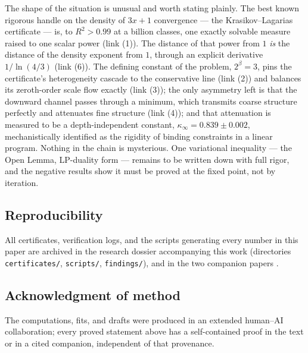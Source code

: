 \documentclass[11pt]{article}
\theoremstyle{definition}
\theoremstyle{remark}
\newcommand{\bet}{\beta}
\newcommand{\kap}{\kappa}
\begin{document}
The shape of the situation is unusual and worth stating plainly. The best known
rigorous handle on the density of $3x+1$ convergence --- the Krasikov--Lagarias
certificate --- is, to $R^2 > 0.99$ at a billion classes, one exactly solvable
measure raised to one scalar power (link (1)). The distance of that power from
$1$ \emph{is} the distance of the density exponent from $1$, through an explicit
derivative $1/\ln(4/3)$ (link (6)). The defining constant of the problem,
$2^{\bet} = 3$, pins the certificate's heterogeneity cascade to the conservative
line (link (2)) and balances its zeroth-order scale flow exactly (link (3)); the
only asymmetry left is that the downward channel passes through a minimum, which
transmits coarse structure perfectly and attenuates fine structure (link (4));
and that attenuation is measured to be a depth-independent constant,
$\kap_\infty = 0.839 \pm 0.002$, mechanistically identified as the rigidity of
binding constraints in a linear program. Nothing in the chain is mysterious.
One variational inequality --- the Open Lemma, LP-duality form --- remains to be
written down with full rigor, and the negative results show it must be proved at
the fixed point, not by iteration.

\subsection*{Reproducibility}
All certificates, verification logs, and the scripts generating every number in
this paper are archived in the research dossier accompanying this work
(directories \texttt{certificates/}, \texttt{scripts/}, \texttt{findings/}), and
in the two companion papers \cite{Temp26,Drift26}.

\subsection*{Acknowledgment of method}
The computations, fits, and drafts were produced in an extended human--AI
collaboration; every proved statement above has a self-contained proof in the
text or in a cited companion, independent of that provenance.
\end{document}
